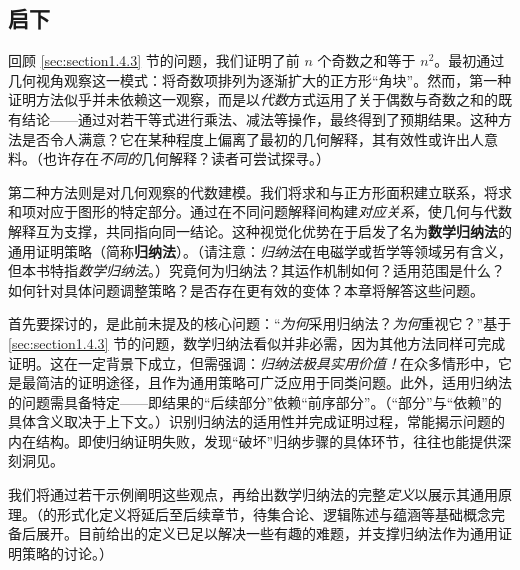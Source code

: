 \subsection{启下}

回顾 \ref{sec:section1.4.3} 节的问题，我们证明了前 $n$ 个奇数之和等于 $n^2$。最初通过几何视角观察这一模式：将奇数项排列为逐渐扩大的正方形``角块''。然而，第一种证明方法似乎并未依赖这一观察，而是以\emph{代数}方式运用了关于偶数与奇数之和的既有结论——通过对若干等式进行乘法、减法等操作，最终得到了预期结果。这种方法是否令人满意？它在某种程度上偏离了最初的几何解释，其有效性或许出人意料。（也许存在\emph{不同的}几何解释？读者可尝试探寻。）

第二种方法则是对几何观察的代数建模。我们将求和与正方形面积建立联系，将求和项对应于图形的特定部分。通过在不同问题解释间构建\emph{对应关系}，使几何与代数解释互为支撑，共同指向同一结论。这种视觉化优势在于启发了名为\textbf{数学归纳法}的通用证明策略（简称\textbf{归纳法}）。（请注意：\emph{归纳法}在电磁学或哲学等领域另有含义，但本书特指\emph{数学归纳法}。）究竟何为归纳法？其运作机制如何？适用范围是什么？如何针对具体问题调整策略？是否存在更有效的变体？本章将解答这些问题。

首先要探讨的，是此前未提及的核心问题：``\emph{为何}采用归纳法？\emph{为何}重视它？''基于 \ref{sec:section1.4.3} 节的问题，数学归纳法看似并非必需，因为其他方法同样可完成证明。这在一定背景下成立，但需强调：\emph{归纳法极具实用价值！}在众多情形中，它是最简洁的证明途径，且作为通用策略可广泛应用于同类问题。此外，适用归纳法的问题需具备特定——即结果的``后续部分''依赖``前序部分''。（``部分''与``依赖''的具体含义取决于上下文。）识别归纳法的适用性并完成证明过程，常能揭示问题的内在结构。即使归纳证明失败，发现``破坏''归纳步骤的具体环节，往往也能提供深刻洞见。

我们将通过若干示例阐明这些观点，再给出数学归纳法的完整\emph{定义}以展示其通用原理。（的形式化定义将延后至后续章节，待集合论、逻辑陈述与蕴涵等基础概念完备后展开。目前给出的定义已足以解决一些有趣的难题，并支撑归纳法作为通用证明策略的讨论。）
